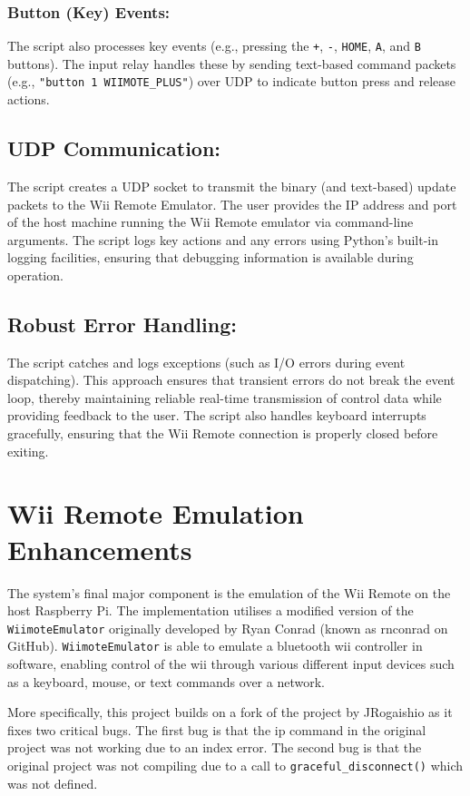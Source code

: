 \subsubsection{Button (Key) Events:}
The script also processes key events (e.g., pressing the \texttt{+}, \texttt{-}, \texttt{HOME}, \texttt{A}, and \texttt{B} buttons). The input relay handles these by sending text-based command packets (e.g., \texttt{"button 1 WIIMOTE\_PLUS"}) over UDP to indicate button press and release actions.

\subsection{UDP Communication:}
The script creates a UDP socket to transmit the binary (and text-based) update packets to the Wii Remote Emulator. The user provides the IP address and port of the host machine running the Wii Remote emulator via command-line arguments. The script logs key actions and any errors using Python’s built-in logging facilities, ensuring that debugging information is available during operation.

\subsection{Robust Error Handling:}
The script catches and logs exceptions (such as I/O errors during event dispatching). This approach ensures that transient errors do not break the event loop, thereby maintaining reliable real-time transmission of control data while providing feedback to the user. The script also handles keyboard interrupts gracefully, ensuring that the Wii Remote connection is properly closed before exiting.

\section{Wii Remote Emulation Enhancements}

The system’s final major component is the emulation of the Wii Remote on the host
Raspberry Pi. The implementation utilises a modified version of the
\texttt{WiimoteEmulator} originally developed by Ryan
Conrad\cite{wiimote_emulator} (known as rnconrad on GitHub).
\texttt{WiimoteEmulator} is able to emulate a bluetooth wii controller in
software, enabling control of the wii through various different input devices such
as a keyboard, mouse, or text commands over a network.

More specifically, this project builds on a fork of the project by
JRogaishio\cite{jr_wiimote_emu} as it fixes two critical bugs. The first bug is
that the ip command in the original project was not working due to an index
error. The second bug is that the original project was not compiling due to a
call to \texttt{graceful\_disconnect()} which was not defined.

